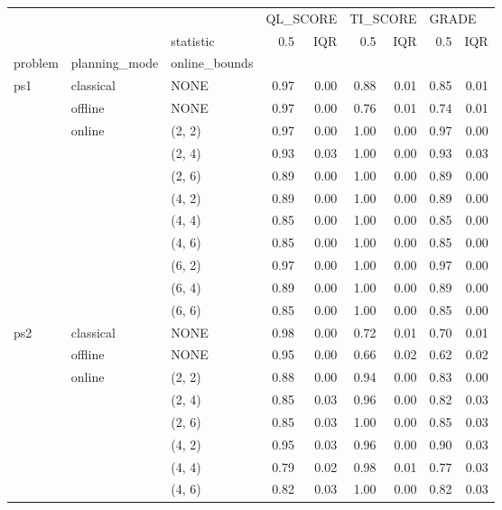 \begin{tabular}{lllrrrrrr}
\toprule
    &        & {} & \multicolumn{2}{l}{QL\_SCORE} & \multicolumn{2}{l}{TI\_SCORE} & \multicolumn{2}{l}{GRADE} \\
    &        & statistic &      0.5 &  IQR &      0.5 &  IQR &   0.5 &  IQR \\
problem & planning\_mode & online\_bounds &          &      &          &      &       &      \\
\midrule
ps1 & classical & NONE &     0.97 & 0.00 &     0.88 & 0.01 &  0.85 & 0.01 \\
    & offline & NONE &     0.97 & 0.00 &     0.76 & 0.01 &  0.74 & 0.01 \\
    & online & (2, 2) &     0.97 & 0.00 &     1.00 & 0.00 &  0.97 & 0.00 \\
    &        & (2, 4) &     0.93 & 0.03 &     1.00 & 0.00 &  0.93 & 0.03 \\
    &        & (2, 6) &     0.89 & 0.00 &     1.00 & 0.00 &  0.89 & 0.00 \\
    &        & (4, 2) &     0.89 & 0.00 &     1.00 & 0.00 &  0.89 & 0.00 \\
    &        & (4, 4) &     0.85 & 0.00 &     1.00 & 0.00 &  0.85 & 0.00 \\
    &        & (4, 6) &     0.85 & 0.00 &     1.00 & 0.00 &  0.85 & 0.00 \\
    &        & (6, 2) &     0.97 & 0.00 &     1.00 & 0.00 &  0.97 & 0.00 \\
    &        & (6, 4) &     0.89 & 0.00 &     1.00 & 0.00 &  0.89 & 0.00 \\
    &        & (6, 6) &     0.85 & 0.00 &     1.00 & 0.00 &  0.85 & 0.00 \\
ps2 & classical & NONE &     0.98 & 0.00 &     0.72 & 0.01 &  0.70 & 0.01 \\
    & offline & NONE &     0.95 & 0.00 &     0.66 & 0.02 &  0.62 & 0.02 \\
    & online & (2, 2) &     0.88 & 0.00 &     0.94 & 0.00 &  0.83 & 0.00 \\
    &        & (2, 4) &     0.85 & 0.03 &     0.96 & 0.00 &  0.82 & 0.03 \\
    &        & (2, 6) &     0.85 & 0.03 &     1.00 & 0.00 &  0.85 & 0.03 \\
    &        & (4, 2) &     0.95 & 0.03 &     0.96 & 0.00 &  0.90 & 0.03 \\
    &        & (4, 4) &     0.79 & 0.02 &     0.98 & 0.01 &  0.77 & 0.03 \\
    &        & (4, 6) &     0.82 & 0.03 &     1.00 & 0.00 &  0.82 & 0.03 \\

\end{tabular}
